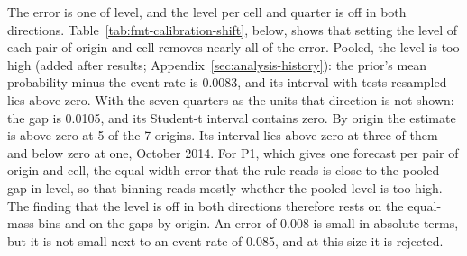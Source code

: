 The error is one of level, and the level per cell and quarter is off in both directions. Table~\ref{tab:fmt-calibration-shift}, below, shows that setting the level of each pair of origin and cell removes nearly all of the error. Pooled, the level is too high (added after results; Appendix~\ref{sec:analysis-history}): the prior's mean probability minus the event rate is 0.0083, and its interval with tests resampled lies above zero. With the seven quarters as the units that direction is not shown: the gap is 0.0105, and its Student-t interval contains zero. By origin the estimate is above zero at 5 of the 7 origins. Its interval lies above zero at three of them and below zero at one, October 2014. For P1, which gives one forecast per pair of origin and cell, the equal-width error that the rule reads is close to the pooled gap in level, so that binning reads mostly whether the pooled level is too high. The finding that the level is off in both directions therefore rests on the equal-mass bins and on the gaps by origin. An error of 0.008 is small in absolute terms, but it is not small next to an event rate of 0.085, and at this size it is rejected.

